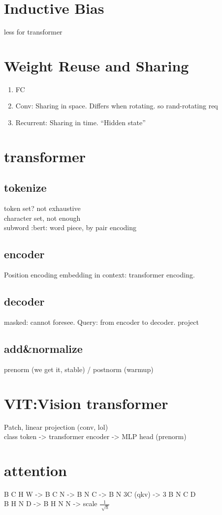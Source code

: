 \documentclass[]{article}
\begin{document}
    \section{Inductive Bias} 
        less for transformer
    \section{Weight Reuse and Sharing}
        \begin{enumerate}
            \item FC 
            \item Conv: Sharing in space.
                Differs when rotating. so rand-rotating req  
            \item Recurrent: Sharing in time. ``Hidden state''
            
        \end{enumerate}
    \section{transformer}
        \subsection{tokenize}
            token set? not exhaustive \\
            character set, not enough\\
            subword :bert: word piece, by pair encoding
        \subsection[]{encoder} 
            Position encoding
            embedding in context: transformer encoding.
        \subsection[]{decoder}
            masked: cannot foresee.
            Query: from encoder to decoder.
            project 
        \subsection[]{add\&normalize}
            prenorm (we get it, stable) / postnorm (warmup)
    \section{VIT:Vision transformer}
        Patch, linear projection (conv, lol) \\
        class token -> transformer encoder -> MLP head (prenorm) \\ 
    \section[]{attention}
        B C H W -> B C N -> B N C -> B N 3C (qkv) -> 3 B N C D \\
        B H N D -> B H N N -> scale $\frac{1}{\sqrt[]{h}}$
    
    
\end{document}
